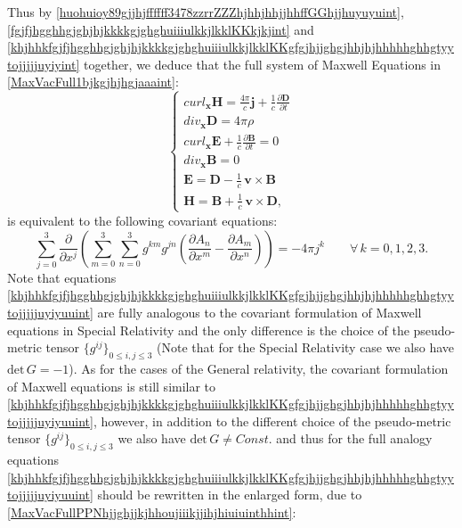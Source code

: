 \documentclass{article}
\theoremstyle{definition}
\theoremstyle{remark}
\renewcommand{\vec}[1]{\mathbf{#1}}
\newcommand{\er}{\eqref}
\newcommand{\er}{\eqref}
\begin{document}
Thus by
\er{huohuioy89gjjhjffffff3478zzrrZZZhjhhjhhjjhhffGGhjjhuyuyuint},
\er{fgjfjhgghhgjghjhjkkkkgjghghuiiiulkkjlkklKKkjkjint} and
\er{khjhhkfgjfjhgghhgjghjhjkkkkgjghghuiiiulkkjlkklKKgfgjhjjghgjhhjhjhhhhhghhgtyytojjjjjuyiyint}
together, we deduce that the full system of Maxwell Equations in
\er{MaxVacFull1bjkgjhjhgjaaaint}:
\begin{equation}\label{MaxVacFullPPNhjjghyghghiyyhhint}
\begin{cases}
curl_{\vec x} \vec H=\frac{4\pi}{c}\vec j+\frac{1}{c}\frac{\partial \vec D}{\partial t}\\
div_{\vec x} \vec D=4\pi\rho\\
curl_{\vec x} \vec E+\frac{1}{c}\frac{\partial \vec B}{\partial t}=0\\
div_{\vec x} \vec B=
0\\
\vec E=\vec D-\frac{1}{c}\,\vec v\times
\vec B\\
\vec H=\vec B+\frac{1}{c}\,\vec v\times \vec D,
\end{cases}
\end{equation}
is equivalent to the following covariant equations:
\begin{equation}\label{khjhhkfgjfjhgghhgjghjhjkkkkgjghghuiiiulkkjlkklKKgfgjhjjghgjhhjhjhhhhhghhgtyytojjjjjuyiyuuint}
\sum_{j=0}^{3}\frac{\partial}{\partial
x^j}\left(\sum_{m=0}^{3}\sum_{n=0}^{3}g^{km}g^{jn}\left(\frac{\partial
A_n}{\partial x^m}-\frac{\partial A_m}{\partial
x^n}\right)\right)=-4\pi j^k\quad\quad\forall\, k=0,1,2,3.
\end{equation}
Note that equations
\er{khjhhkfgjfjhgghhgjghjhjkkkkgjghghuiiiulkkjlkklKKgfgjhjjghgjhhjhjhhhhhghhgtyytojjjjjuyiyuuint}
are fully analogous to the covariant formulation of Maxwell
equations in Special Relativity and the only difference is the
choice of the pseudo-metric tensor $\{g^{ij}\}_{0\leq i,j\leq 3}$
(Note that for the Special Relativity case we also have
$\text{det}\,G=-1$). As for the cases of the General relativity, the
covariant formulation of Maxwell equations is still similar to
\er{khjhhkfgjfjhgghhgjghjhjkkkkgjghghuiiiulkkjlkklKKgfgjhjjghgjhhjhjhhhhhghhgtyytojjjjjuyiyuuint},
however, in addition to the different choice of the pseudo-metric
tensor $\{g^{ij}\}_{0\leq i,j\leq 3}$ we also have
$\text{det}\,G\neq Const.$ and thus for the full analogy equations
\er{khjhhkfgjfjhgghhgjghjhjkkkkgjghghuiiiulkkjlkklKKgfgjhjjghgjhhjhjhhhhhghhgtyytojjjjjuyiyuuint}
should be rewritten in the enlarged form, due to
\er{MaxVacFullPPNhjjghjjkjhhoujiiikjjihjhiuiuinthhint}:
\end{document}
